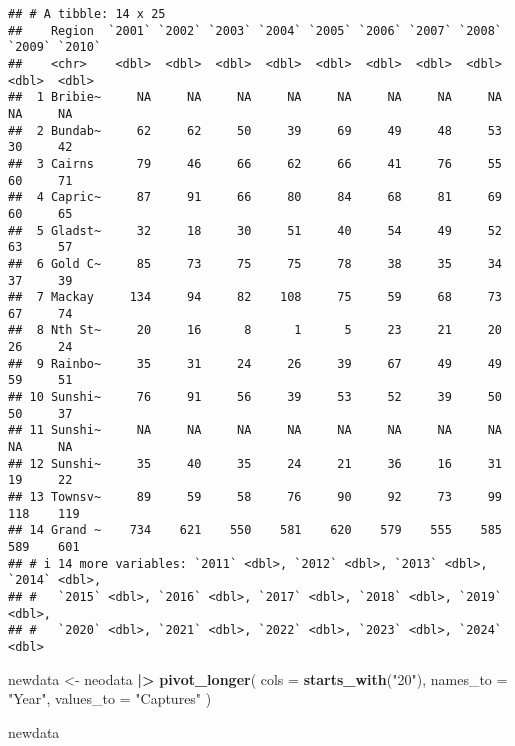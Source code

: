 \documentclass[
]{article}
\newenvironment{Shaded}{\begin{snugshade}}{\end{snugshade}}
\newcommand{\AttributeTok}[1]{\textcolor[rgb]{0.13,0.29,0.53}{#1}}
\newcommand{\FunctionTok}[1]{\textcolor[rgb]{0.13,0.29,0.53}{\textbf{#1}}}
\newcommand{\NormalTok}[1]{#1}
\newcommand{\OtherTok}[1]{\textcolor[rgb]{0.56,0.35,0.01}{#1}}
\newcommand{\SpecialCharTok}[1]{\textcolor[rgb]{0.81,0.36,0.00}{\textbf{#1}}}
\newcommand{\StringTok}[1]{\textcolor[rgb]{0.31,0.60,0.02}{#1}}
\begin{document}
\begin{verbatim}
## # A tibble: 14 x 25
##    Region  `2001` `2002` `2003` `2004` `2005` `2006` `2007` `2008` `2009` `2010`
##    <chr>    <dbl>  <dbl>  <dbl>  <dbl>  <dbl>  <dbl>  <dbl>  <dbl>  <dbl>  <dbl>
##  1 Bribie~     NA     NA     NA     NA     NA     NA     NA     NA     NA     NA
##  2 Bundab~     62     62     50     39     69     49     48     53     30     42
##  3 Cairns      79     46     66     62     66     41     76     55     60     71
##  4 Capric~     87     91     66     80     84     68     81     69     60     65
##  5 Gladst~     32     18     30     51     40     54     49     52     63     57
##  6 Gold C~     85     73     75     75     78     38     35     34     37     39
##  7 Mackay     134     94     82    108     75     59     68     73     67     74
##  8 Nth St~     20     16      8      1      5     23     21     20     26     24
##  9 Rainbo~     35     31     24     26     39     67     49     49     59     51
## 10 Sunshi~     76     91     56     39     53     52     39     50     50     37
## 11 Sunshi~     NA     NA     NA     NA     NA     NA     NA     NA     NA     NA
## 12 Sunshi~     35     40     35     24     21     36     16     31     19     22
## 13 Townsv~     89     59     58     76     90     92     73     99    118    119
## 14 Grand ~    734    621    550    581    620    579    555    585    589    601
## # i 14 more variables: `2011` <dbl>, `2012` <dbl>, `2013` <dbl>, `2014` <dbl>,
## #   `2015` <dbl>, `2016` <dbl>, `2017` <dbl>, `2018` <dbl>, `2019` <dbl>,
## #   `2020` <dbl>, `2021` <dbl>, `2022` <dbl>, `2023` <dbl>, `2024` <dbl>
\end{verbatim}

\begin{Shaded}
\begin{Highlighting}[]
\NormalTok{newdata }\OtherTok{\textless{}{-}}\NormalTok{ neodata }\SpecialCharTok{|\textgreater{}}
  \FunctionTok{pivot\_longer}\NormalTok{(}
    \AttributeTok{cols =} \FunctionTok{starts\_with}\NormalTok{(}\StringTok{"20"}\NormalTok{),}
    \AttributeTok{names\_to =} \StringTok{"Year"}\NormalTok{,}
    \AttributeTok{values\_to =} \StringTok{"Captures"}
\NormalTok{  )}
\end{Highlighting}
\end{Shaded}

\begin{Shaded}
\begin{Highlighting}[]
\NormalTok{newdata}
\end{Highlighting}
\end{Shaded}
\end{document}

